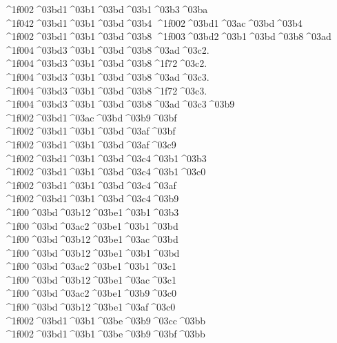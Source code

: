 {^^^^1f002^^^^03bd1^^^^03b1^^^^03bd^^^^03b1^^^^03b3^^^^03ba
^^^^1f042^^^^03bd1^^^^03b1^^^^03bd^^^^03b4 		%
^^^^1f002^^^^03bd1^^^^03ac^^^^03bd^^^^03b4
^^^^1f002^^^^03bd1^^^^03b1^^^^03bd^^^^03b8 		%
	^^^^1f003^^^^03bd2^^^^03b1^^^^03bd^^^^03b8^^^^03ad 		%
		^^^^1f004^^^^03bd3^^^^03b1^^^^03bd^^^^03b8^^^^03ad^^^^03c2. 		%
		^^^^1f004^^^^03bd3^^^^03b1^^^^03bd^^^^03b8^^^^1f72^^^^03c2.
		^^^^1f004^^^^03bd3^^^^03b1^^^^03bd^^^^03b8^^^^03ad^^^^03c3.
		^^^^1f004^^^^03bd3^^^^03b1^^^^03bd^^^^03b8^^^^1f72^^^^03c3.
		^^^^1f004^^^^03bd3^^^^03b1^^^^03bd^^^^03b8^^^^03ad^^^^03c3^^^^03b9
^^^^1f002^^^^03bd1^^^^03ac^^^^03bd^^^^03b9^^^^03bf 		%
^^^^1f002^^^^03bd1^^^^03b1^^^^03bd^^^^03af^^^^03bf
^^^^1f002^^^^03bd1^^^^03b1^^^^03bd^^^^03af^^^^03c9
^^^^1f002^^^^03bd1^^^^03b1^^^^03bd^^^^03c4^^^^03b1^^^^03b3 		%
^^^^1f002^^^^03bd1^^^^03b1^^^^03bd^^^^03c4^^^^03b1^^^^03c0 		%
^^^^1f002^^^^03bd1^^^^03b1^^^^03bd^^^^03c4^^^^03af 		%
^^^^1f002^^^^03bd1^^^^03b1^^^^03bd^^^^03c4^^^^03b9
^^^^1f00^^^^03bd^^^^03b12^^^^03be1^^^^03b1^^^^03b3  		%
^^^^1f00^^^^03bd^^^^03ac2^^^^03be1^^^^03b1^^^^03bd 		%
^^^^1f00^^^^03bd^^^^03b12^^^^03be1^^^^03ac^^^^03bd
^^^^1f00^^^^03bd^^^^03b12^^^^03be1^^^^03b1^^^^03bd 		%
^^^^1f00^^^^03bd^^^^03ac2^^^^03be1^^^^03b1^^^^03c1	 	%
^^^^1f00^^^^03bd^^^^03b12^^^^03be1^^^^03ac^^^^03c1
^^^^1f00^^^^03bd^^^^03ac2^^^^03be1^^^^03b9^^^^03c0  		%
^^^^1f00^^^^03bd^^^^03b12^^^^03be1^^^^03af^^^^03c0
^^^^1f002^^^^03bd1^^^^03b1^^^^03be^^^^03b9^^^^03cc^^^^03bb   		%
^^^^1f002^^^^03bd1^^^^03b1^^^^03be^^^^03b9^^^^03bf^^^^03bb
}
